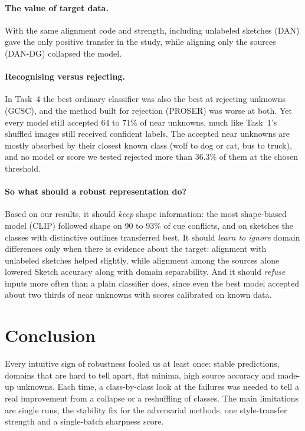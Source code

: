 \documentclass{article}
\begin{document}
\paragraph{The value of target data.} With the same alignment code and strength, including unlabeled sketches (DAN) gave the only positive transfer in the study, while aligning only the sources (DAN-DG) collapsed the model.

\paragraph{Recognising versus rejecting.} In Task~4 the best ordinary classifier was also the best at rejecting unknowns (GCSC), and the method built for rejection (PROSER) was worse at both. Yet every model still accepted 64 to 71\% of near unknowns, much like Task~1's shuffled images still received confident labels. The accepted near unknowns are mostly absorbed by their closest known class (wolf to dog or cat, bus to truck), and no model or score we tested rejected more than 36.3\% of them at the chosen threshold.

\paragraph{So what should a robust representation do?} Based on our results, it should \emph{keep} shape information: the most shape-biased model (CLIP) followed shape on 90 to 93\% of cue conflicts, and on sketches the classes with distinctive outlines transferred best. It should \emph{learn to ignore} domain differences only when there is evidence about the target: alignment with unlabeled sketches helped slightly, while alignment among the sources alone lowered Sketch accuracy along with domain separability. And it should \emph{refuse} inputs more often than a plain classifier does, since even the best model accepted about two thirds of near unknowns with scores calibrated on known data.

\section{Conclusion}
Every intuitive sign of robustness fooled us at least once: stable predictions, domains that are hard to tell apart, flat minima, high source accuracy and made-up unknowns. Each time, a class-by-class look at the failures was needed to tell a real improvement from a collapse or a reshuffling of classes. The main limitations are single runs, the stability fix for the adversarial methods, one style-transfer strength and a single-batch sharpness score.
\end{document}
